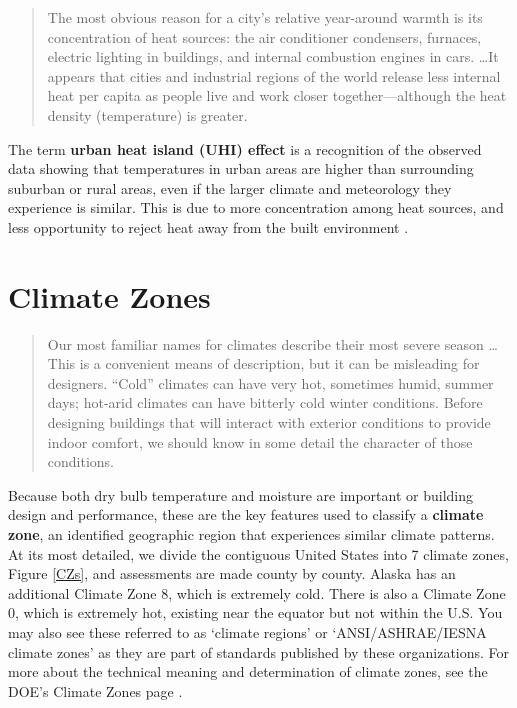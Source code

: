 \documentclass[10pt]{article}
\begin{document}
\begin{quote}
    The most obvious reason for a city's relative year-around warmth is its concentration of heat sources: the air conditioner condensers, furnaces, electric lighting in buildings, and internal combustion engines in cars. \ldots It appears that cities and industrial regions of the world release less internal heat per capita as people live and work closer together---although the heat density (temperature) is greater. \cite{Grondzik2014-gt}
\end{quote}

The term \textbf{urban heat island (UHI) effect}  is a recognition of the observed data showing that temperatures in urban areas are higher than surrounding suburban or rural areas, even if the larger climate and meteorology they experience is similar. This is due to more concentration among heat sources, and less opportunity to reject heat away from the built environment \cite{Grondzik2014-gt}.

\section{Climate Zones}

\begin{quote}
    Our most familiar names for climates describe their most severe season \ldots This is a convenient means of description, but it can be misleading for designers. ``Cold'' climates can have very hot, sometimes humid, summer days; hot-arid climates can have bitterly cold winter conditions. Before designing buildings that will interact with exterior conditions to provide indoor comfort, we should know in some detail the character of those conditions. \cite{Grondzik2014-gt}
\end{quote}

Because both dry bulb temperature and moisture are important or building design and performance, these are the key features used to classify a \textbf{climate zone}, an identified geographic region that experiences similar climate patterns. At its most detailed, we divide the contiguous United States into 7 climate zones, Figure \ref{CZs}, and assessments are made county by county. Alaska has an additional Climate Zone 8, which is extremely cold. There is also a Climate Zone 0, which is extremely hot, existing near the equator but not within the U.S.  You may also see these referred to as `climate regions' or `ANSI/ASHRAE/IESNA climate zones' as they are part of standards published by these organizations. For more about the technical meaning and determination of climate zones, see the DOE's Climate Zones page \cite{noauthor_undated-ax}. 
\end{document}
